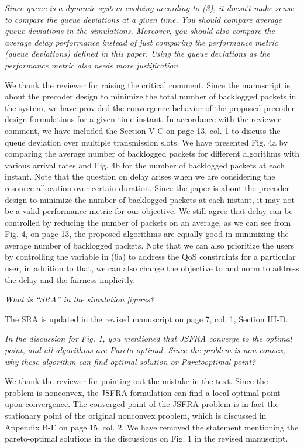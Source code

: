 \begin{itemize}
 \textit{Since queue is a dynamic system evolving according to (3), it doesn’t make sense to compare the queue deviations at a given time. You should compare average queue deviations in the simulations. Moreover, you should also compare the average delay performance instead of just comparing the performance metric (queue deviations) defined in this paper. Using the queue deviations as the performance metric also needs more justification.}

\resp We thank the reviewer for raising the critical comment. Since the manuscript is about the precoder design to minimize the total number of backlogged packets in the system, we have provided the convergence behavior of the proposed precoder design formulations for a given time instant. In accordance with the reviewer comment, we have included the Section V-C on page 13, col. 1 to discuss the queue deviation over multiple transmission slots. We have presented Fig. 4a by comparing the average number of backlogged packets for different algorithms with various arrival rates and Fig. 4b for the number of backlogged packets at each instant. Note that the question on delay arises when we are considering the resource allocation over certain duration. Since the paper is about the precoder design to minimize the number of backlogged packets at each instant, it may not be a valid performance metric for our objective. We still agree that delay can be controlled by reducing the number of packets on an average, as we can see from Fig. 4, on page 13, the proposed algorithms are equally good in minimizing the average number of backlogged packets. Note that we can also prioritize the users by controlling the variable  in (6a) to address the QoS constraints for a particular user, in addition to that, we can also change the objective to  and \me{\ell_{\infty}} norm to address the delay and the fairness implicitly. 

 \textit{What is “SRA” in the simulation figures?}

\resp The \acf{SRA} is updated in the revised manuscript on page 7, col. 1, Section III-D.

 \textit{In the discussion for Fig. 1, you mentioned that JSFRA converge to the optimal point, and all algorithms are Pareto-optimal. Since the problem is non-convex, why these algorithm can find optimal solution or Paretooptimal point?}

\resp We thank the reviewer for pointing out the mistake in the text. Since the problem is nonconvex, the JSFRA formulation can find a local optimal point upon convergence. The converged point of the JSFRA problem is in fact the stationary point of the original nonconvex problem, which is discussed in Appendix B-E on page 15, col. 2. We have removed the statement mentioning the pareto-optimal solutions in the discussions on Fig. 1 in the revised manuscript.

\end{itemize}



